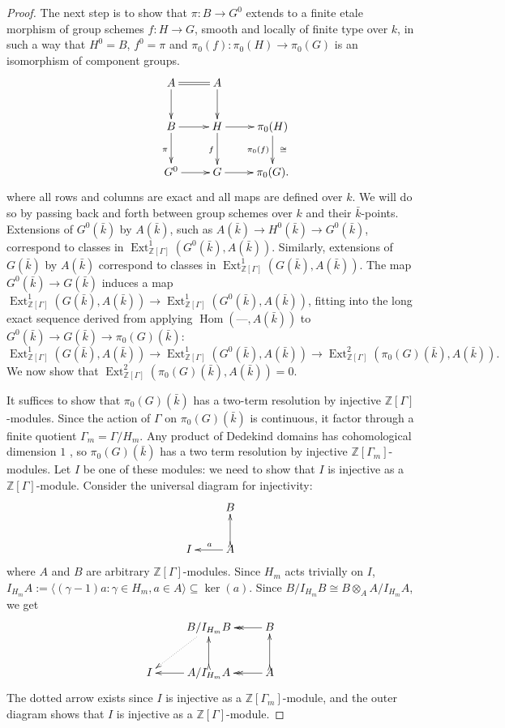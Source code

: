 \documentclass[11pt]{amsart}
\theoremstyle{plain}
\theoremstyle{definition}
\theoremstyle{remark}
\newcommand{\ZZ}{{\mathbb{Z}}}
\newcommand{\bFq}{\bar{k}}
\newcommand{\Fq}{k}
\DeclareMathOperator{\Hom}{Hom}
\DeclareMathOperator{\Ext}{Ext}
\newcommand{\iso}{{\ \cong\ }}
\begin{document}
\begin{proof}
The next step is to show that $\pi: B \to G^0$ extends to a finite etale morphism of group schemes $f: H\to G$, smooth and locally of finite type over $\Fq$, in such a way that $H^0 = B$, $f^0 =\pi$ and $\pi_0(f) : \pi_0(H)\to \pi_0(G)$ is an isomorphism of component groups.
\begin{equation} \label{extension-diagram}
    \xymatrix{
        & A \ar[d] \ar@{=}[r] & A \ar[d] &  \\
        & B \ar[r] \ar[d]_{\pi} & H \ar[r] \ar[d]_{f} & \pi_0(H) \ar[d]_{\pi_0(f)}^{\iso} \\
        & G^0 \ar[r] & G \ar[r] & \pi_0(G).}
\end{equation}
where all rows and columns are exact and all maps are defined over $\Fq$.  We will do so by passing back and forth between group schemes over $\Fq$ and their $\bFq$-points.  Extensions of $G^0(\bFq)$ by $A(\bFq)$, such as $A(\bFq) \to H^0(\bFq) \to G^0(\bFq)$, correspond to classes in $\Ext^1_{\ZZ[\Gamma]}(G^0(\bFq), A(\bFq))$.  Similarly, extensions of $G(\bFq)$ by $A(\bFq)$ correspond to classes in $\Ext^1_{\ZZ[\Gamma]}(G(\bFq), A(\bFq))$.  The map $G^0(\bFq) \to G(\bFq)$ induces a map $\Ext^1_{\ZZ[\Gamma]}(G(\bFq), A(\bFq)) \to \Ext^1_{\ZZ[\Gamma]}(G^0(\bFq), A(\bFq))$, fitting into the long exact sequence derived from applying $\Hom(\mbox{---}, A(\bFq))$ to $G^0(\bFq) \to G(\bFq) \to \pi_0(G)(\bFq)$:
$$\Ext^1_{\ZZ[\Gamma]}(G(\bFq), A(\bFq)) \to \Ext^1_{\ZZ[\Gamma]}(G^0(\bFq), A(\bFq)) \to \Ext^2_{\ZZ[\Gamma]}(\pi_0(G)(\bFq), A(\bFq)).$$
We now show that $\Ext^2_{\ZZ[\Gamma]}(\pi_0(G)(\bFq), A(\bFq)) = 0$.

It suffices to show that $\pi_0(G)(\bFq)$ has a two-term resolution by injective $\ZZ[\Gamma]$-modules.  Since the action of $\Gamma$ on $\pi_0(G)(\bFq)$ is continuous, it factor through a finite quotient $\Gamma_m = \Gamma / H_m$.  Any product of Dedekind domains has cohomological dimension $1$ \cite[?]{?}, so $\pi_0(G)(\bFq)$ has a two term resolution by injective $\ZZ[\Gamma_m]$-modules.  Let $I$ be one of these modules: we need to show that $I$ is injective as a $\ZZ[\Gamma]$-module.  Consider the universal diagram for injectivity:
\[
\xymatrix{
& B \\
I & A \ar@{>->}[u] \ar[l]_{a}
}\]
where $A$ and $B$ are arbitrary $\ZZ[\Gamma]$-modules.  Since $H_m$ acts trivially on $I$, $I_{H_m}A := \langle (\gamma-1)a : \gamma \in H_m, a \in A \rangle \subseteq \ker(a).$  Since $B / I_{H_m}B \cong B \otimes_A A / I_{H_m}A$, we get
\[
\xymatrix{
& B/I_{H_m}B \ar@{..>}[dl] & B \ar@{->>}[l] \\
I & A/I_{H_m}A \ar@{>->}[u] \ar[l] & A \ar@{>->}[u] \ar@{->>}[l]
}\]
The dotted arrow exists since $I$ is injective as a $\ZZ[\Gamma_m]$-module, and the outer diagram shows that $I$ is injective as a $\ZZ[\Gamma]$-module.


\end{proof}
\end{document}
